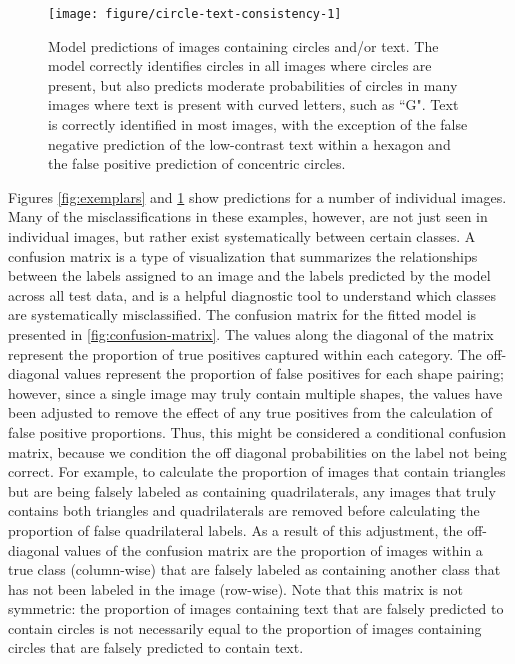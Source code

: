 \documentclass{article}\usepackage[]{graphicx}\usepackage[table]{xcolor}
\newenvironment{knitrout}{}{} %
\begin{document}
\begin{knitrout}
\color{fgcolor}\begin{figure}[p!]

{\centering \texttt{[image: figure/circle-text-consistency-1]}

}

\caption[Model predictions of images containing circles and/or text]{Model predictions of images containing circles and/or text. The model correctly identifies circles in all images where circles are present, but also predicts moderate probabilities of circles in many images where text is present with curved letters, such as ``G". Text is correctly identified in most images, with the exception of the false negative prediction of the low-contrast text within a hexagon and the false positive prediction of concentric circles.}\label{fig:circle-text-consistency}
\end{figure}


\end{knitrout}

Figures \ref{fig:exemplars} and \ref{fig:circle-text-consistency} show predictions for a number of individual images. Many of the misclassifications in these examples, however, are not just seen in individual images, but rather exist systematically between certain classes. A confusion matrix is a type of visualization that summarizes the relationships between the labels assigned to an image and the labels predicted by the model across all test data, and is a helpful diagnostic tool to understand which classes are systematically misclassified. The confusion matrix for the fitted model is presented in \autoref{fig:confusion-matrix}. The values along the diagonal of the matrix represent the proportion of true positives captured within each category. The off-diagonal values represent the proportion of false positives for each shape pairing; however, since a single image may truly contain multiple shapes, the values have been adjusted to remove the effect of any true positives from the calculation of false positive proportions. Thus, this might be considered a conditional confusion matrix, because we condition the off diagonal probabilities on the label not being correct. For example, to calculate the proportion of images that contain triangles but are being falsely labeled as containing quadrilaterals, any images that truly contains both triangles and quadrilaterals are removed before calculating the proportion of false quadrilateral labels. As a result of this adjustment, the off-diagonal values of the confusion matrix are the proportion of images within a true class (column-wise) that are falsely labeled as containing another class that has not been labeled in the image (row-wise). Note that this matrix is not symmetric: the proportion of images containing text that are falsely predicted to contain circles is not necessarily equal to the proportion of images containing circles that are falsely predicted to contain text.
\end{document}
